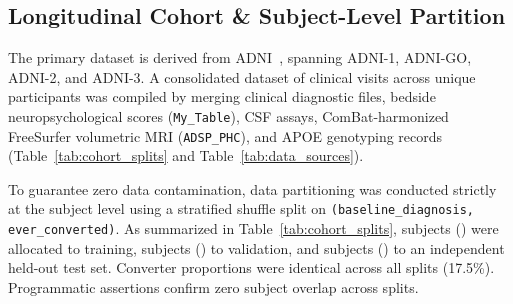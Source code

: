 \documentclass[11pt,a4paper]{article}
\begin{document}
\subsection{Longitudinal Cohort & Subject-Level Partition}
The primary dataset is derived from ADNI~\cite{petersen2010adni}, spanning ADNI-1, ADNI-GO, ADNI-2, and ADNI-3. A consolidated dataset of \TotalRows{} clinical visits across \TotalSubjects{} unique participants was compiled by merging clinical diagnostic files, bedside neuropsychological scores (\texttt{My\_Table}), CSF assays, ComBat-harmonized FreeSurfer volumetric MRI (\texttt{ADSP\_PHC}), and APOE genotyping records (Table~\ref{tab:cohort_splits} and Table~\ref{tab:data_sources}).




To guarantee zero data contamination, data partitioning was conducted strictly at the subject level using a stratified shuffle split on \texttt{(baseline\_diagnosis, ever\_converted)}. As summarized in Table~\ref{tab:cohort_splits}, \TrainSubjects{} subjects (\TrainPct{}) were allocated to training, \ValSubjects{} subjects (\ValPct{}) to validation, and \TestSubjects{} subjects (\TestPct{}) to an independent held-out test set. Converter proportions were identical across all splits (17.5\%). Programmatic assertions confirm zero subject overlap across splits.
\end{document}
